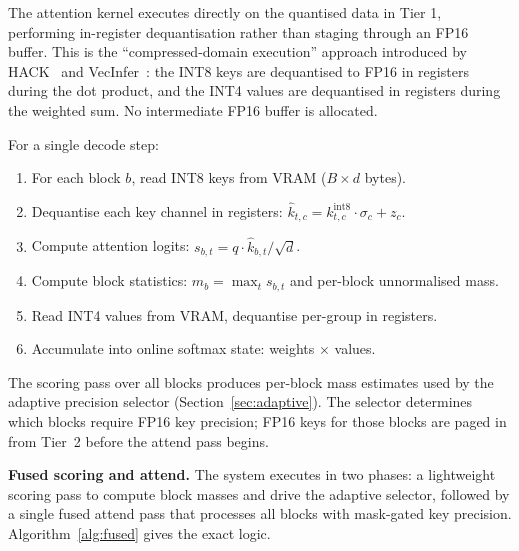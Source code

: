 \documentclass[10pt,twocolumn,a4paper]{article}
\theoremstyle{definition}
\theoremstyle{remark}
\begin{document}
The attention kernel executes directly on the quantised data in Tier 1, performing in-register dequantisation rather than staging through an FP16 buffer.  This is the ``compressed-domain execution'' approach introduced by HACK~\cite{hack} and VecInfer~\cite{vecinfer}: the INT8 keys are dequantised to FP16 in registers during the dot product, and the INT4 values are dequantised in registers during the weighted sum.  No intermediate FP16 buffer is allocated.

For a single decode step:
\begin{enumerate}[leftmargin=2em,itemsep=2pt]
  \item For each block $b$, read INT8 keys from VRAM ($B \times d$ bytes).
  \item Dequantise each key channel in registers: $\hat{k}_{t,c} = k_{t,c}^{\mathrm{int8}} \cdot \sigma_c + z_c$.
  \item Compute attention logits: $s_{b,t} = q \cdot \hat{k}_{b,t} / \sqrt{d}$.
  \item Compute block statistics: $m_b = \max_t s_{b,t}$ and per-block unnormalised mass.
  \item Read INT4 values from VRAM, dequantise per-group in registers.
  \item Accumulate into online softmax state: weights $\times$ values.
\end{enumerate}

The scoring pass over all blocks produces per-block mass estimates used by the adaptive precision selector (Section~\ref{sec:adaptive}).  The selector determines which blocks require FP16 key precision; FP16 keys for those blocks are paged in from Tier~2 before the attend pass begins.

\textbf{Fused scoring and attend.}  The system executes in two phases: a lightweight scoring pass to compute block masses and drive the adaptive selector, followed by a single fused attend pass that processes all blocks with mask-gated key precision.  Algorithm~\ref{alg:fused} gives the exact logic.
\end{document}
